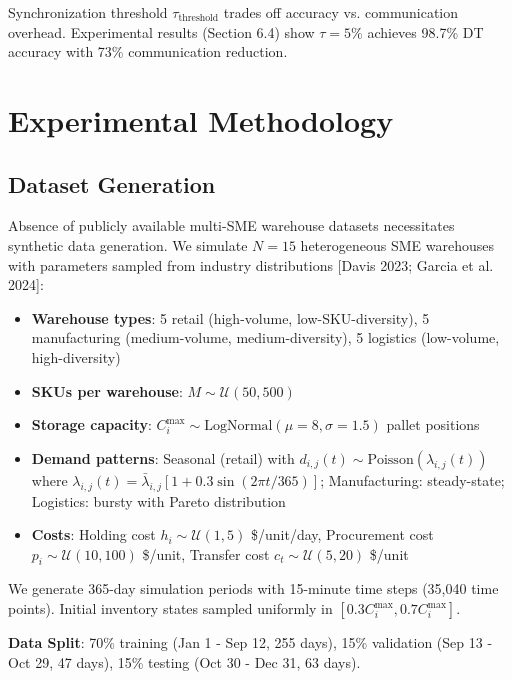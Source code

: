 \documentclass[times,10pt,twocolumn]{jucs2e}
\begin{document}
Synchronization threshold $\tau_{\text{threshold}}$ trades off accuracy vs. communication overhead. Experimental results (Section 6.4) show $\tau = 5\%$ achieves 98.7\% DT accuracy with 73\% communication reduction.


\section{Experimental Methodology}

\subsection{Dataset Generation}

Absence of publicly available multi-SME warehouse datasets necessitates synthetic data generation. We simulate $N = 15$ heterogeneous SME warehouses with parameters sampled from industry distributions [Davis 2023; Garcia et al. 2024]:

\begin{itemize}
\item \textbf{Warehouse types}: 5 retail (high-volume, low-SKU-diversity), 5 manufacturing (medium-volume, medium-diversity), 5 logistics (low-volume, high-diversity)
\item \textbf{SKUs per warehouse}: $M \sim \mathcal{U}(50, 500)$
\item \textbf{Storage capacity}: $C_i^{\max} \sim \text{LogNormal}(\mu = 8, \sigma = 1.5)$ pallet positions
\item \textbf{Demand patterns}: Seasonal (retail) with $d_{i,j}(t) \sim \text{Poisson}(\lambda_{i,j}(t))$ where $\lambda_{i,j}(t) = \bar{\lambda}_{i,j} [1 + 0.3 \sin(2\pi t / 365)]$; Manufacturing: steady-state; Logistics: bursty with Pareto distribution
\item \textbf{Costs}: Holding cost $h_i \sim \mathcal{U}(1, 5)$ \$/unit/day, Procurement cost $p_i \sim \mathcal{U}(10, 100)$ \$/unit, Transfer cost $c_t \sim \mathcal{U}(5, 20)$ \$/unit
\end{itemize}

We generate 365-day simulation periods with 15-minute time steps (35,040 time points). Initial inventory states sampled uniformly in $[0.3 C_i^{\max}, 0.7 C_i^{\max}]$.

\textbf{Data Split}: 70\% training (Jan 1 - Sep 12, 255 days), 15\% validation (Sep 13 - Oct 29, 47 days), 15\% testing (Oct 30 - Dec 31, 63 days).
\end{document}
